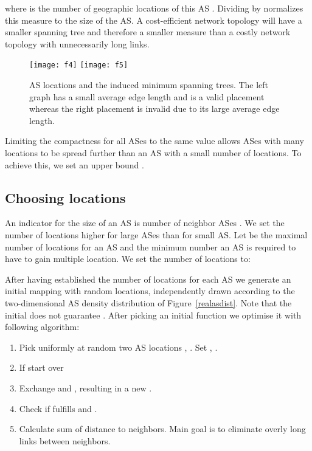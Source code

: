 \documentclass{sig-alternate-10pt}
\begin{document}
\begin{enumerate}
\noindent where   is the number of geographic locations of this AS . Dividing by  normalizes this measure to the size of the AS. 
 A cost-efficient network topology will have a smaller spanning tree and therefore a smaller measure  than a costly network topology with unnecessarily  long links. 

\begin{figure}
\texttt{[image: f4]}
\hfil
\texttt{[image: f5]}

\caption{AS locations and the induced minimum spanning trees. The left graph has a small average edge length and is a valid placement whereas the right placement is invalid due to its large average edge length. }
\label{figmst}
\end{figure}

Limiting the compactness for all ASes to the same value allows ASes with many locations to be spread further than an AS with a small number of locations. To achieve this, we set an upper bound .

\subsection{Choosing locations}
\label{sec:choos-numb-neighb}

An indicator for the size of an AS  is number of neighbor ASes . We set the number of locations higher for large ASes  than for small AS. Let  be the maximal number of locations for an AS and  the minimum number an AS is required to have to gain multiple location. We set the number of locations  to:


After having established the number of locations for each AS
 we generate an initial mapping  with  random locations, independently drawn according to the two-dimensional  AS density distribution of Figure~\ref{realasdist}. 
Note that the initial  does not guarantee .  After picking an initial function  we optimise it with following algorithm:
\begin{enumerate}
\item \label{algstep1} Pick uniformly at random two AS locations , . Set , . 
\item If  start over
\item Exchange  and , resulting in a new  . \item Check if  fulfills  and .
\item Calculate sum of distance to neighbors. Main goal is to eliminate overly long links between neighbors. 



\end{enumerate}
\end{enumerate}
\end{document}
